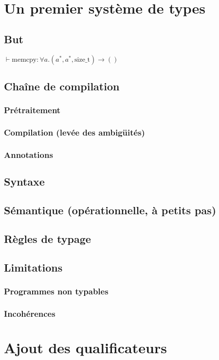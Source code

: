\documentclass{phdthesis}
\begin{document}
\chapter{Un premier système de types}

\section{But}

$⊢ \text{memcpy} : ∀ a . (a^*, a^*, \text{size\_t}) → ()$

\section{Chaîne de compilation}
\subsection{Prétraitement}
\subsection{Compilation (levée des ambigüités)}
\subsection{Annotations}
\section{Syntaxe}
\section{Sémantique (opérationnelle, à petits pas)}
\section{Règles de typage}
\section{Limitations}
\subsection{Programmes non typables}
\subsection{Incohérences}

\chapter{Ajout des qualificateurs}
\end{document}
